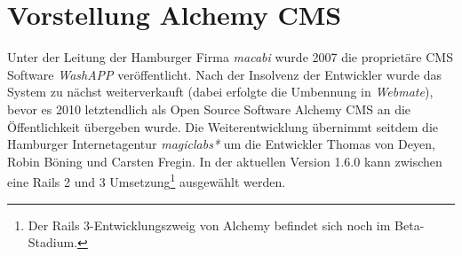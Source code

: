\section{Vorstellung Alchemy CMS}
Unter der Leitung der Hamburger Firma \emph{macabi} wurde 2007 die proprietäre CMS Software \emph{WashAPP} veröffentlicht. Nach der Insolvenz der Entwickler wurde das System zu nächst weiterverkauft (dabei erfolgte die Umbennung in \emph{Webmate}), bevor es 2010 letztendlich als Open Source Software Alchemy CMS an die Öffentlichkeit übergeben wurde. Die Weiterentwicklung übernimmt seitdem die Hamburger Internetagentur \emph{magiclabs*} um die Entwickler Thomas von Deyen, Robin Böning und Carsten Fregin.
\newline
In der aktuellen Version 1.6.0 kann zwischen eine Rails 2 und 3 Umsetzung\footnote{Der Rails 3-Entwicklungszweig von Alchemy befindet sich noch im Beta-Stadium.} ausgewählt werden.
